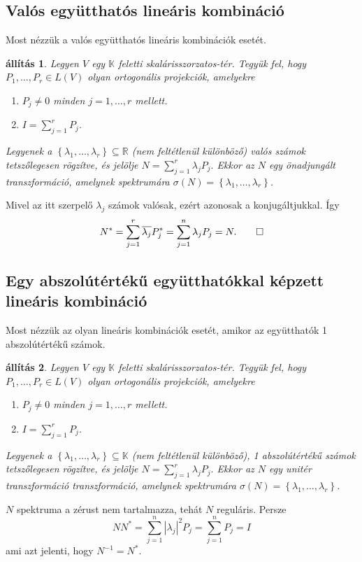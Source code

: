 \documentclass[9pt, a4paper, showtrims]{memoir}
\makeatletter
\renewenvironment{proof}[1][\proofname]
    {\par\pushQED{\qed}%
    \normalfont \topsep6\p@\@plus6\p@\relax
    \trivlist
    \item[\hskip\labelsep
        \itshape
    #1\@addpunct{:}]\ignorespaces}
    {\popQED\endtrivlist\@endpefalse}
\theoremstyle{plain}
\newtheorem{proposition}{állítás}[chapter]
\theoremstyle{remark}
\theoremstyle{definition}
\makeatother
\begin{document}
\subsection{Valós együtthatós lineáris kombináció}
Most nézzük a valós együtthatós lineáris kombinációk esetét.
\begin{proposition}\label{pr:normlinkombvalos}
	Legyen $V$ egy $\mathbb{K}$ feletti skalárisszorzatos-tér.
	Tegyük fel, hogy $P_1,\ldots,P_r\in L\left( V \right)$ olyan ortogonális projekciók,
	amelyekre
	\begin{enumerate}
		\item $P_j\neq 0$ minden $j=1,\ldots,r$ mellett.
		\item $I=\sum_{j=1}^rP_j$.
	\end{enumerate}
	Legyenek a $\left\{ \lambda_1,\ldots,\lambda_r \right\}\subseteq \mathbb{R}$
	(nem feltétlenül különböző) valós számok tetszőlegesen rögzítve,
	és jelölje
	\(
	N
	=
	\sum_{j=1}^r\lambda_jP_j.
	\)
	Ekkor az $N$ egy \emph{önadjungált} transzformáció,
	amelynek spektrumára $\sigma\left( N \right)=\left\{ \lambda_1,\ldots,\lambda_r \right\}$.
\end{proposition}
\begin{proof}
	Mivel az itt szerpelő $\lambda_j$ számok valósak,
	ezért azonosak a konjugáltjukkal.
	Így
	\begin{displaymath}
		N^\ast=
		\sum_{j=1}^r\overline{\lambda_j}P_j^\ast
		=
		\sum_{j=1}^n\lambda_jP_j
		=N.
		\qedhere
	\end{displaymath}
\end{proof}

\subsection{Egy abszolútértékű együtthatókkal képzett lineáris kombináció}
Most nézzük az olyan lineáris kombinációk esetét, amikor az együtthatók 1 abszolútértékű számok.
\begin{proposition}\label{pr:normlinkombegys}
	Legyen $V$ egy $\mathbb{K}$ feletti skalárisszorzatos-tér.
	Tegyük fel, hogy $P_1,\ldots,P_r\in L\left( V \right)$ olyan ortogonális projekciók,
	amelyekre
	\begin{enumerate}
		\item $P_j\neq 0$ minden $j=1,\ldots,r$ mellett.
		\item $I=\sum_{j=1}^rP_j$.
	\end{enumerate}
	Legyenek a $\left\{ \lambda_1,\ldots,\lambda_r \right\}\subseteq \mathbb{K}$
	(nem feltétlenül különböző),
	1 abszolútértékű számok tetszőlegesen rögzítve,
	és jelölje
	\(
	N
	=
	\sum_{j=1}^r\lambda_jP_j.
	\)
	Ekkor az $N$ egy \emph{unitér transzformáció} transzformáció,
	amelynek spektrumára $\sigma\left( N \right)=\left\{ \lambda_1,\ldots,\lambda_r \right\}$.
\end{proposition}
\begin{proof}
	$N$ spektruma a zérust nem tartalmazza, tehát $N$ reguláris.
	Persze $$NN^\ast=\sum_{j=1}^n|\lambda_j|^2P_j=\sum_{j=1}^nP_j=I$$ ami azt jelenti,
	hogy $N^{-1}=N^\ast$.
\end{proof}
\end{document}
